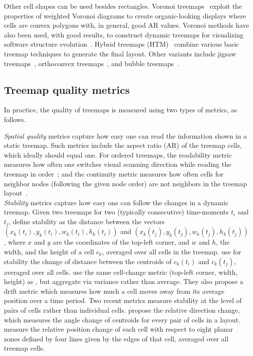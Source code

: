 Other cell shapes can be used besides rectangles. Voronoi treemaps~\citep{balzer05,balzer05b} exploit the properties of weighted Voronoi diagrams to create organic-looking displays where cells are convex polygons with, in general, good AR values. Voronoi methods have also been used, with good results, to construct dynamic treemaps for visualizing software structure evolution~\citep{hees17,gotz11}. Hybrid treemaps (HTM)~\citep{htm} combine various basic treemap techniques to generate the final layout. Other variants include jigsaw treemaps~\citep{jigsaw}, orthoconvex treemaps~\citep{deberg14}, and bubble treemaps~\citep{bubble}.

\subsection{Treemap quality metrics}
\label{sec:quality}
%
%
In practice, the quality of treemaps is measured using two types of metrics, as follows.

\noindent\emph{Spatial quality} metrics capture how easy one can read the information shown in a static treemap. Such metrics include the aspect ratio (AR) of the treemap cells, which ideally should equal one. For ordered treemaps, the readability metric measures how often one switches visual scanning direction while reading the treemap in order~\citep{bederson02}; and the continuity metric measures how often cells for neighbor nodes (following the given node order) are not neighbors in the treemap layout~\citep{spiral}.\\

\noindent\emph{Stability} metrics capture how easy one can follow the changes in a dynamic treemap. Given two  treemaps for two (typically consecutive) time-moments $t_i$ and $t_j$, \cite{ordered} define stability as the distance between the vectors $(x_k(t_i), y_k(t_i), w_k(t_i), h_k(t_i))$ and $(x_k(t_j), y_k(t_j), w_k(t_j), h_k(t_j))$, where $x$ and $y$ are the coordinates of the top-left corner, and $w$ and $h$, the width, and the height of a cell $c_k$, averaged over all cells in the treemap.
\cite{hahn10} use for stability the change of distance between the centroids of $c_k(t_i)$ and $c_k(t_j)$, averaged over all cells.
\cite{hilbert_moore} use the same cell-change metric (top-left corner, width, height) as \cite{ordered}, but aggregate via variance rather than average. They also propose a drift metric which measures how much a cell moves away from its average position over a time period. Two recent metrics measure stability at the level of pairs of cells rather than individual cells. \cite{Hahn2017} propose the relative direction change, which measures the angle change of centroids for every pair of cells in a layout. \cite{sondag17} measure the relative position change of each cell with respect to eight planar zones defined by four lines given by the edges of that cell, averaged over all treemap cells.

